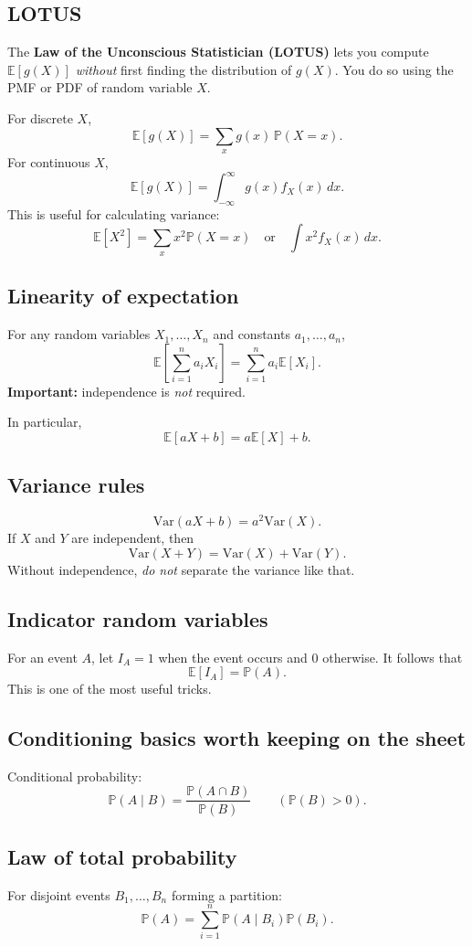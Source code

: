 \documentclass[11pt]{article}
\newcommand{\E}{\mathbb{E}}
\newcommand{\Var}{\mathrm{Var}}
\newcommand{\Prob}{\mathbb{P}}
\newcommand{\1}{\mathbf{1}}
\begin{document}
\subsection{LOTUS}
The \textbf{Law of the Unconscious Statistician (LOTUS)} lets you compute $\E[g(X)]$ \textit{without} first finding the distribution of $g(X)$. You do so using the PMF or PDF of random variable $X$.

For discrete $X$,
\[
    \E[g(X)] = \sum_x g(x)\,\Prob(X=x).
\]
For continuous $X$,
\[
    \E[g(X)] = \int_{-\infty}^{\infty} g(x)f_X(x)\,dx.
\]
This is useful for calculating variance:
\[
    \E[X^2] = \sum_x x^2\Prob(X=x) \quad \text{or} \quad \int x^2 f_X(x)\,dx.
\]

\subsection{Linearity of expectation}
For any random variables $X_1,\dots,X_n$ and constants $a_1,\dots,a_n$,
\[
    \E\left[\sum_{i=1}^n a_i X_i\right] = \sum_{i=1}^n a_i\E[X_i].
\]
\textbf{Important:} independence is \textit{not} required.

In particular,
\[
    \E[aX+b] = a\E[X]+b.
\]

\subsection{Variance rules}
\[
    \Var(aX+b)=a^2\Var(X).
\]
If $X$ and $Y$ are independent, then
\[
    \Var(X+Y)=\Var(X)+\Var(Y).
\]
Without independence, \textit{do not} separate the variance like that.

\subsection{Indicator random variables}
For an event $A$, let $I_A = 1$ when the event occurs and $0$ otherwise. It follows that 
\[
    \E[I_A]=\Prob(A).
\]
This is one of the most useful tricks. 

\subsection{Conditioning basics worth keeping on the sheet}
Conditional probability:
\[
    \Prob(A\mid B)=\frac{\Prob(A\cap B)}{\Prob(B)} \qquad (\Prob(B)>0).
\]

\subsection{Law of total probability}
For disjoint events $B_1,\dots,B_n$ forming a partition:
\[
    \Prob(A)=\sum_{i=1}^n \Prob(A\mid B_i)\Prob(B_i).
\]
\end{document}
